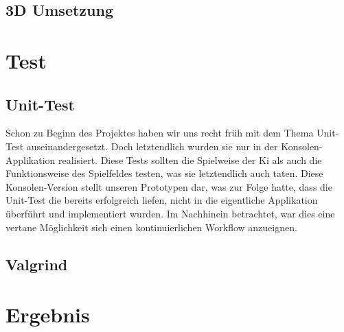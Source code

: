 \documentclass[a4paper]{scrartcl}
\begin{document}
\subsection{3D Umsetzung}\label{ch:3DUmsetzung}

\section{Test}\label{ch:Test}
\subsection{Unit-Test}\label{ch:Unit}
Schon zu Beginn des Projektes haben wir uns recht früh mit dem Thema Unit-Test auseinandergesetzt. Doch letztendlich wurden sie nur in der Konsolen-Applikation realisiert. Diese Tests sollten die Spielweise der Ki als auch die 
Funktionsweise des Spielfeldes testen, was sie letztendlich auch taten. Diese Konsolen-Version stellt unseren Prototypen dar, was zur Folge hatte, dass die Unit-Test die bereits erfolgreich liefen, nicht in die eigentliche Applikation überführt und implementiert wurden. Im Nachhinein betrachtet, war dies eine vertane Möglichkeit sich einen kontinuierlichen Workflow anzueignen. 

\subsection{Valgrind}\label{ch:Valgrind}

\section{Ergebnis}\label{ch:Ergebnis}
\end{document}
